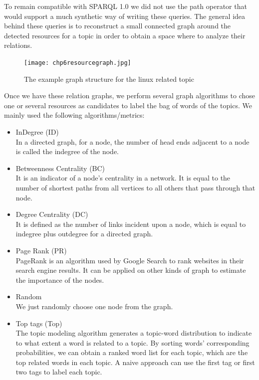 To remain compatible with SPARQL 1.0 we did not use the path operator that would support a much synthetic way of writing these queries. The general idea behind these queries is to reconstruct a small connected graph around the detected resources for a topic in order to obtain a space where to analyze their relations.

\begin{figure}[htp]
\centering
\texttt{[image: chp6resourcegraph.jpg]}  
\caption{The example graph structure for the linux related topic}
\label{fig:chp6resourcegraph} 
\end{figure}

Once we have these relation graphs, we perform several graph algorithms to chose one or several resources as candidates to label the bag of words of the topics. We mainly used the following algorithms/metrics:
\begin{itemize}
    \item {InDegree (ID)} \\
    In a directed graph, for a node, the number of head ends adjacent to a node is called the indegree of the node. 
    \item {Betweenness Centrality (BC)} \\
    It is an indicator of a node's centrality in a network. It is equal to the number of shortest paths from all vertices to all others that pass through that node.
    \item {Degree Centrality (DC)} \\
    It is defined as the number of links incident upon a node, which is equal to indegree plus outdegree for a directed graph.
    \item {Page Rank\cite{chp6page1999pagerank} (PR)}\\
    PageRank is an algorithm used by Google Search to rank websites in their search engine results. It can be applied on other kinds of graph to estimate the importance of the nodes.
    \item {Random} \\
    We just randomly choose one node from the graph.
    \item {Top tags (Top)} \\
    The topic modeling algorithm generates a topic-word distribution to indicate to what extent a word is related to a topic. By sorting words' corresponding probabilities, we can obtain a ranked word list for each topic, which are the top related words in each topic. A naive approach can use the first tag or first two tags to label each topic. 
\end{itemize}


